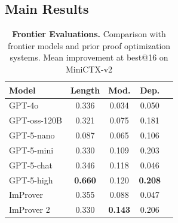 


\subsection{Main Results}
\label{sec:main_results}



\begin{table}
\centering
\caption{\textbf{Frontier Evaluations.} Comparison with frontier models and prior proof optimization systems. Mean improvement at best@16 on MiniCTX-v2}
\small
\begin{tabular}{l|cccc}
\hline
\textbf{Model}  & \textbf{Length} & \textbf{Mod.} & \textbf{Dep.} \\
\hline
GPT-4o & 0.336 & 0.034 & 0.050  \\ 
GPT-oss-120B & 0.321 & 0.075 & 0.181  \\
GPT-5-nano  & 0.087 & 0.065 & 0.106 \\
GPT-5-mini   & 0.330 & 0.109 & 0.203  \\
GPT-5-chat  & 0.346 & 0.118 & 0.046  \\
GPT-5-high  & \textbf{0.660} & 0.120 & \textbf{0.208}  \\
\hdashline
ImProver & 0.355 & 0.088 & 0.047  \\ 
ImProver 2  & 0.330 & \textbf{0.143} & 0.206  \\

\hline
\end{tabular}
\label{tab:frontier}
\end{table}



